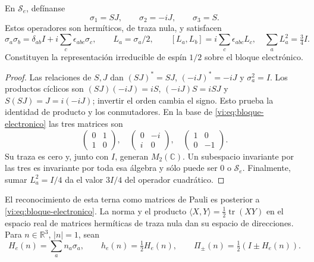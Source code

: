 \begin{proposition}
\label{vi:prop:spin}
En $\mathscr S_e$, defínanse
\begin{equation}
 \sigma_1=SJ,\qquad \sigma_2=-iJ,\qquad \sigma_3=S.
 \label{vi:eq:terna}
\end{equation}
Estos operadores son hermíticos, de traza nula, y satisfacen
\begin{equation}
 \sigma_a\sigma_b=\delta_{ab}I+
 i\sum_c\epsilon_{abc}\sigma_c,
 \qquad L_a=\sigma_a/2,\qquad
 [L_a,L_b]=i\sum_c\epsilon_{abc}L_c,
 \quad\sum_aL_a^2=\tfrac34I.
 \label{vi:eq:spin-algebra}
\end{equation}
Constituyen la representación irreducible de espín $1/2$ sobre
el bloque electrónico.
\end{proposition}
\begin{proof}
Las relaciones de $S,J$ dan $(SJ)^*=SJ$, $(-iJ)^*=-iJ$ y
$\sigma_a^2=I$. Los productos cíclicos son
$(SJ)(-iJ)=iS$, $(-iJ)S=iSJ$ y $S(SJ)=J=i(-iJ)$;
invertir el orden cambia el signo. Esto prueba la identidad de
producto y los conmutadores. En la base de
\eqref{vi:eq:bloque-electronico} las tres matrices son
\[
 \begin{pmatrix}0&1\\1&0\end{pmatrix},\quad
 \begin{pmatrix}0&-i\\i&0\end{pmatrix},\quad
 \begin{pmatrix}1&0\\0&-1\end{pmatrix}.
\]
Su traza es cero y, junto con $I$, generan $M_2(\mathbb C)$.
Un subespacio invariante por las tres es invariante por toda esa
álgebra y sólo puede ser $0$ o $\mathscr S_e$. Finalmente,
sumar $L_a^2=I/4$ da el valor $3I/4$ del operador cuadrático.
\end{proof}

El reconocimiento de esta terna como matrices de Pauli es posterior
a \eqref{vi:eq:bloque-electronico}. La norma y el producto
$\langle X,Y\rangle=\tfrac12\operatorname{tr}(XY)$ en el
espacio real de matrices hermíticas de traza nula dan su espacio
de direcciones. Para $n\in\mathbb R^3$, $|n|=1$, sean
\begin{equation}
 H_e(n)=\sum_an_a\sigma_a,\qquad
 h_e(n)=\tfrac12H_e(n),\qquad
 \Pi_\pm(n)=\tfrac12(I\pm H_e(n)).
 \label{vi:eq:helicidad}
\end{equation}

